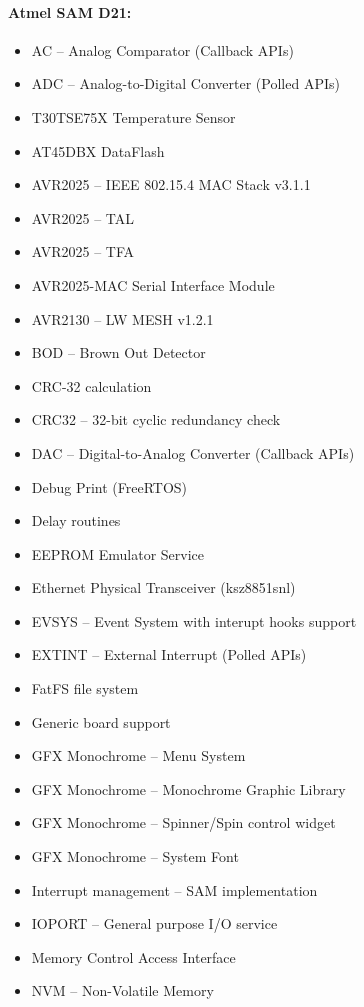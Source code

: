 \paragraph{Atmel SAM D21:} \cite{AtmelSAMd20API}
\begin{multicols}{2}
\begin{itemize}
	\setlength\itemsep{1pt}
	\item AC -- Analog Comparator (Callback APIs)
	\item ADC -- Analog-to-Digital Converter (Polled APIs)
	\item T30TSE75X Temperature Sensor
	\item AT45DBX DataFlash
	\item AVR2025 -- IEEE 802.15.4 MAC Stack v3.1.1
	\item AVR2025 -- TAL
	\item AVR2025 -- TFA
	\item AVR2025-MAC Serial Interface Module
	\item AVR2130 -- LW MESH v1.2.1
	\item BOD -- Brown Out Detector
	\item CRC-32 calculation
	\item CRC32 -- 32-bit cyclic redundancy check
	\item DAC -- Digital-to-Analog Converter (Callback APIs)
	\item Debug Print (FreeRTOS)
	\item Delay routines
	\item EEPROM Emulator Service
	\item Ethernet Physical Transceiver (ksz8851snl)
	\item EVSYS -- Event System with interupt hooks support
	\item EXTINT -- External Interrupt (Polled APIs)
	\item FatFS file system
	\item Generic board support
	\item GFX Monochrome -- Menu System
	\item GFX Monochrome -- Monochrome Graphic Library
	\item GFX Monochrome -- Spinner/Spin control widget
	\item GFX Monochrome -- System Font
	\item Interrupt management -- SAM implementation
	\item IOPORT -- General purpose I/O service
	\item Memory Control Access Interface
	\item NVM -- Non-Volatile Memory

\end{itemize}
\end{multicols}
